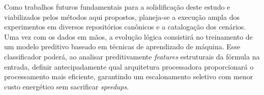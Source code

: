 \documentclass[12pt]{article}
\begin{document}
Como trabalhos futuros fundamentais para a solidificação deste estudo e viabilizados pelos métodos aqui propostos, planeja-se a execução ampla dos experimentos em diversos repositórios canônicos e a catalogação dos cenários. Uma vez com os dados em mãos, a evolução lógica consistirá no treinamento de um modelo preditivo baseado em técnicas de aprendizado de máquina. Esse classificador poderá, ao analisar preditivamente \textit{features} estruturais da fórmula na entrada, definir antecipadamente qual arquitetura processadora proporcionará o processamento mais eficiente, garantindo um escalonamento seletivo com menor custo energético sem sacrificar \textit{speedups}.



\end{document}
